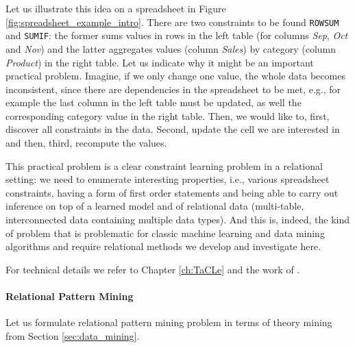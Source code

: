 
Let us illustrate this idea on a spreadsheet in Figure
\ref{fig:spreadsheet_example_intro}. There are two constraints to be
found \texttt{ROWSUM} and \texttt{SUMIF}: the former sums values in rows
in the left table (for columns \textit{Sep}, \textit{Oct} and
\textit{Nov}) and the latter aggregates values (column \textit{Sales}) by category (column
\textit{Product}) in the
right table. Let us indicate why it might be
an important practical problem. Imagine, if we only change one value, the whole data becomes
inconsistent, since there are dependencies in the spreadsheet
to be met, e.g., for example the last column in the left table must be
updated, as well the corresponding category value in the right table. Then, we would like to, first, discover all constraints in the data. Second, update the cell we are interested in and then, third, recompute the values. 

This practical problem is a clear constraint learning problem in a relational setting: we need to enumerate interesting properties, i.e., various spreadsheet constraints, having a form of first order statements and being able to carry out inference on top of a learned model and of relational data (multi-table, interconnected data containing multiple data types). And this is, indeed, the kind of problem that is problematic for classic machine learning and data mining algorithms and require relational methods we develop and investigate here.

For technical details we refer to Chapter \ref{ch:TaCLe} and the work of \textcite{tacle_demo}.
\pubrevend


\paragraph{Relational Pattern Mining}
Let us formulate relational pattern mining problem in terms of theory
mining from Section \ref{sec:data_mining}.\\

